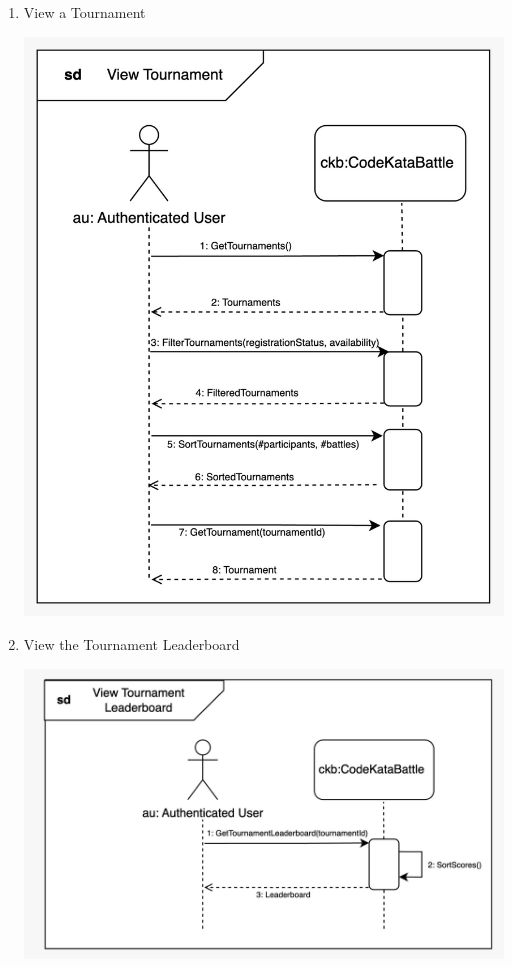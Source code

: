 \begin{enumerate}
\begin{center}
    \end{center}
    \newpage
    \item View a Tournament
    \begin{center}
            \includegraphics[scale=0.2]{Images/sequence_diagrams/SD-view_tournament.jpeg}
    \end{center}
    \item View the Tournament Leaderboard
    \begin{center}
            \includegraphics[scale=0.2]{Images/sequence_diagrams/SD-view_tournament_leaderboard.jpeg}

\end{center}
\end{enumerate}
